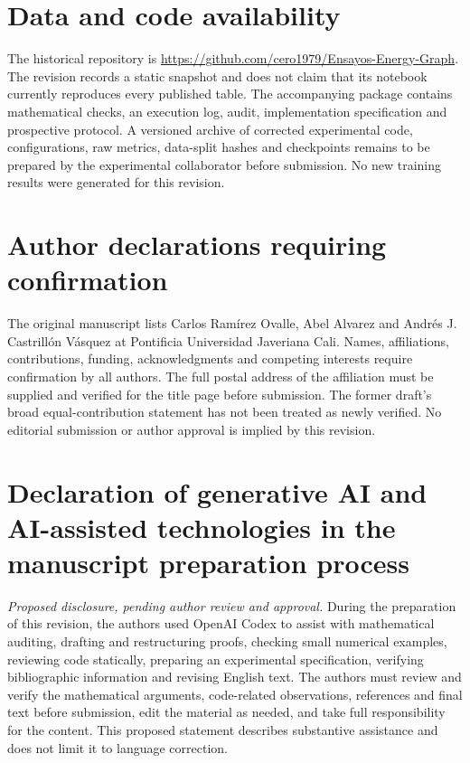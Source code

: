 \section*{Data and code availability}
The historical repository is \url{https://github.com/cero1979/Ensayos-Energy-Graph}. The revision records a static snapshot and does not claim that its notebook currently reproduces every published table. The accompanying package contains mathematical checks, an execution log, audit, implementation specification and prospective protocol. A versioned archive of corrected experimental code, configurations, raw metrics, data-split hashes and checkpoints remains to be prepared by the experimental collaborator before submission. No new training results were generated for this revision.

\section*{Author declarations requiring confirmation}
The original manuscript lists Carlos Ram\'irez Ovalle, Abel Alvarez and Andr\'es J. Castrill\'on V\'asquez at Pontificia Universidad Javeriana Cali. Names, affiliations, contributions, funding, acknowledgments and competing interests require confirmation by all authors. The full postal address of the affiliation must be supplied and verified for the title page before submission. The former draft's broad equal-contribution statement has not been treated as newly verified. No editorial submission or author approval is implied by this revision.

\section*{Declaration of generative AI and AI-assisted technologies in the manuscript preparation process}
\textit{Proposed disclosure, pending author review and approval.} During the preparation of this revision, the authors used OpenAI Codex to assist with mathematical auditing, drafting and restructuring proofs, checking small numerical examples, reviewing code statically, preparing an experimental specification, verifying bibliographic information and revising English text. The authors must review and verify the mathematical arguments, code-related observations, references and final text before submission, edit the material as needed, and take full responsibility for the content. This proposed statement describes substantive assistance and does not limit it to language correction.
